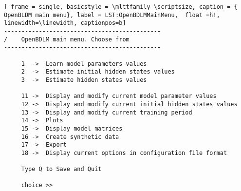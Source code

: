 \begin{lstlisting}[ frame = single, basicstyle = \mlttfamily \scriptsize, caption = { OpenBLDM main menu}, label = LST:OpenBDLMMainMenu,  float =h!, linewidth=\linewidth, captionpos=b]
---------------------------------------------
/    OpenBDLM main menu. Choose from 
--------------------------------------------- 

     1  ->  Learn model parameters values 
     2  ->  Estimate initial hidden states values 
     3  ->  Estimate hidden states values 

     11 ->  Display and modify current model parameter values 
     12 ->  Display and modify current initial hidden states values 
     13 ->  Display and modify current training period 
     14 ->  Plots 
     15 ->  Display model matrices 
     16 ->  Create synthetic data 
     17 ->  Export
     18 ->  Display current options in configuration file format 

     Type Q to Save and Quit 

     choice >> 
\end{lstlisting}




